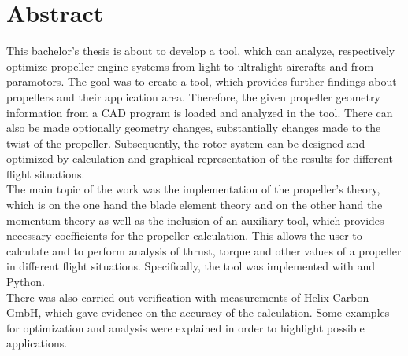 \section*{Abstract}
\label{sec:abstract}

This bachelor’s thesis is about to develop a tool, which can analyze, respectively optimize propeller-engine-systems from light to ultralight aircrafts and from paramotors. The goal was to create a tool, which provides further findings about propellers and their application area. Therefore, the given propeller geometry information from a CAD program is loaded and analyzed in the tool. There can also be made optionally geometry changes, substantially changes made to the twist of the propeller. Subsequently, the rotor system can be designed and optimized by calculation and graphical representation of the results for different flight situations.\\

The main topic of the work was the implementation of the propeller’s theory, which is on the one hand the blade element theory and on the other hand the momentum theory as well as the inclusion of an auxiliary tool, which provides necessary coefficients for the propeller calculation. This allows the user to calculate and to perform analysis of thrust, torque and other values of a propeller in different flight situations. Specifically, the tool was implemented with \MATLAB\cite{matlab} and Python\cite{python}.\\

There was also carried out verification with measurements of Helix Carbon GmbH, which gave evidence on the accuracy of the calculation. Some examples for optimization and analysis were explained in order to highlight possible applications.



